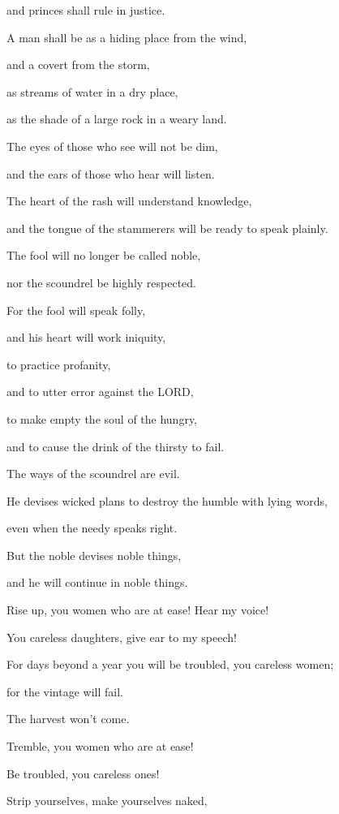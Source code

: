 \quad\quad and princes shall rule in justice.

\myverse{}A man shall be as a hiding place from the wind,

and a covert from the storm,

as streams of water in a dry place,

as the shade of a large rock in a weary land.

\myverse{}The eyes of those who see will not be dim,

and the ears of those who hear will listen.

\myverse{}The heart of the rash will understand knowledge,

and the tongue of the stammerers will be ready to speak plainly.

\myverse{}The fool will no longer be called noble,

nor the scoundrel be highly respected.

\myverse{}For the fool will speak folly,

and his heart will work iniquity,

to practice profanity,

and to utter error against the LORD,

to make empty the soul of the hungry,

and to cause the drink of the thirsty to fail.

\myverse{}The ways of the scoundrel are evil.

He devises wicked plans to destroy the humble with lying words,

even when the needy speaks right.

\myverse{}But the noble devises noble things,

and he will continue in noble things.


\vspace{\baselineskip} \myverse{}Rise up, you women who are at ease! Hear my voice!

You careless daughters, give ear to my speech!

\myverse{}For days beyond a year you will be troubled, you careless women;

for the vintage will fail.

The harvest won’t come.

\myverse{}Tremble, you women who are at ease!

Be troubled, you careless ones!

Strip yourselves, make yourselves naked,

